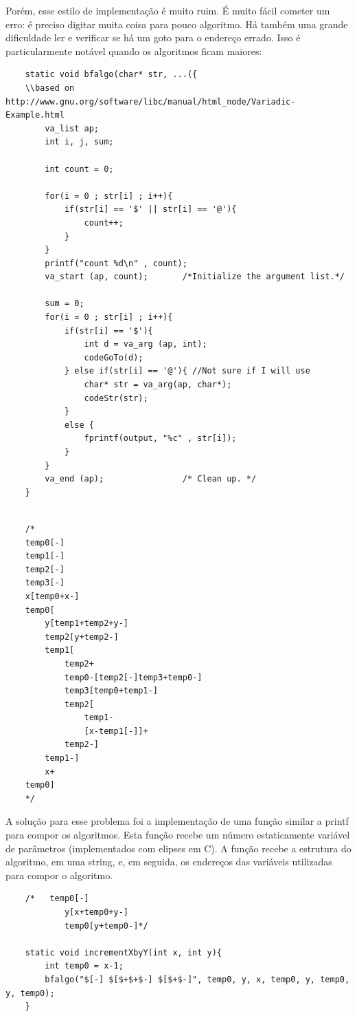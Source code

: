 Porém, esse estilo de implementação é muito ruim. É muito fácil cometer um erro: é preciso digitar muita coisa para pouco algoritmo. Há também uma grande dificuldade ler e verificar se há um goto para o endereço errado. Isso é particularmente notável quando os algoritmos ficam maiores:

\begin{verbatim}
    static void bfalgo(char* str, ...({
    \\based on http://www.gnu.org/software/libc/manual/html_node/Variadic-Example.html
        va_list ap;
        int i, j, sum;
        
        int count = 0;
        
        for(i = 0 ; str[i] ; i++){
            if(str[i] == '$' || str[i] == '@'){
                count++;
            }
        }
        printf("count %d\n" , count);
        va_start (ap, count);       /*Initialize the argument list.*/
        
        sum = 0;
        for(i = 0 ; str[i] ; i++){
            if(str[i] == '$'){
                int d = va_arg (ap, int);
                codeGoTo(d);
            } else if(str[i] == '@'){ //Not sure if I will use
                char* str = va_arg(ap, char*);
                codeStr(str);
            }
            else {
                fprintf(output, "%c" , str[i]);
            }
        }
        va_end (ap);                /* Clean up. */
    }
    
\end{verbatim}

\begin{verbatim}
    /*
    temp0[-]
    temp1[-]
    temp2[-]
    temp3[-]
    x[temp0+x-]
    temp0[
        y[temp1+temp2+y-]
        temp2[y+temp2-]
        temp1[
            temp2+
            temp0-[temp2[-]temp3+temp0-]
            temp3[temp0+temp1-]
            temp2[
                temp1-
                [x-temp1[-]]+
            temp2-]
        temp1-]
        x+
    temp0]
    */
\end{verbatim}

A solução para esse problema foi a implementação de uma função similar a printf para compor os algoritmos. Esta função recebe um número estaticamente variável de parâmetros (implementados com elipses em C). A função recebe a estrutura do algoritmo, em uma string, e, em seguida, os endereços das variáveis utilizadas para compor o algoritmo.

\begin{verbatim}
    /*   temp0[-]
            y[x+temp0+y-]
            temp0[y+temp0-]*/
            
    static void incrementXbyY(int x, int y){
        int temp0 = x-1;
        bfalgo("$[-] $[$+$+$-] $[$+$-]", temp0, y, x, temp0, y, temp0, y, temp0);
    }
\end{verbatim}

